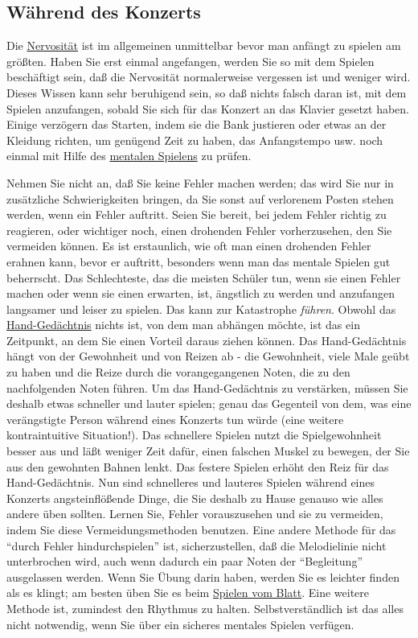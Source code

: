 
\subsection{Während des Konzerts}
\label{c1iii14g}

Die \hyperref[c1iii15]{Nervosität} ist im allgemeinen unmittelbar bevor man anfängt zu spielen am größten.
Haben Sie erst einmal angefangen, werden Sie so mit dem Spielen beschäftigt sein, daß die Nervosität normalerweise vergessen ist und weniger wird.
Dieses Wissen kann sehr beruhigend sein, so daß nichts falsch daran ist, mit dem Spielen anzufangen, sobald Sie sich für das Konzert an das Klavier gesetzt haben.
Einige verzögern das Starten, indem sie die Bank justieren oder etwas an der Kleidung richten, um genügend Zeit zu haben, das Anfangstempo usw. noch einmal mit Hilfe des \hyperref[c1ii12mental]{mentalen Spielens} zu prüfen.

Nehmen Sie nicht an, daß Sie keine Fehler machen werden; das wird Sie nur in zusätzliche Schwierigkeiten bringen, da Sie sonst auf verlorenem Posten stehen werden, wenn ein Fehler auftritt.
Seien Sie bereit, bei jedem Fehler richtig zu reagieren, oder wichtiger noch, einen drohenden Fehler vorherzusehen, den Sie vermeiden können.
Es ist erstaunlich, wie oft man einen drohenden Fehler erahnen kann, bevor er auftritt, besonders wenn man das mentale Spielen gut beherrscht.
Das Schlechteste, das die meisten Schüler tun, wenn sie einen Fehler machen oder wenn sie einen erwarten, ist, ängstlich zu werden und anzufangen langsamer und leiser zu spielen.
Das kann zur Katastrophe \textit{führen}.
Obwohl das \hyperref[c1iii6d]{Hand-Gedächtnis} nichts ist, von dem man abhängen möchte, ist das ein Zeitpunkt, an dem Sie einen Vorteil daraus ziehen können.
Das Hand-Gedächtnis hängt von der Gewohnheit und von Reizen ab - die Gewohnheit, viele Male geübt zu haben und die Reize durch die vorangegangenen Noten, die zu den nachfolgenden Noten führen.
Um das Hand-Gedächtnis zu verstärken, müssen Sie deshalb etwas schneller und lauter spielen; genau das Gegenteil von dem, was eine verängstigte Person während eines Konzerts tun würde (eine weitere kontraintuitive Situation!).
Das schnellere Spielen nutzt die Spielgewohnheit besser aus und läßt weniger Zeit dafür, einen falschen Muskel zu bewegen, der Sie aus den gewohnten Bahnen lenkt.
Das festere Spielen erhöht den Reiz für das Hand-Gedächtnis.
Nun sind schnelleres und lauteres Spielen während eines Konzerts angsteinflößende Dinge, die Sie deshalb zu Hause genauso wie alles andere üben sollten.
Lernen Sie, Fehler vorauszusehen und sie zu vermeiden, indem Sie diese Vermeidungsmethoden benutzen.
Eine andere Methode für das \enquote{durch Fehler hindurchspielen} ist, sicherzustellen, daß die Melodielinie nicht unterbrochen wird, auch wenn dadurch ein paar Noten der \enquote{Begleitung} ausgelassen werden.
Wenn Sie Übung darin haben, werden Sie es leichter finden als es klingt; am besten üben Sie es beim \hyperref[c1iii11]{Spielen vom Blatt}.
Eine weitere Methode ist, zumindest den Rhythmus zu halten.
Selbstverständlich ist das alles nicht notwendig, wenn Sie über ein sicheres mentales Spielen verfügen.

